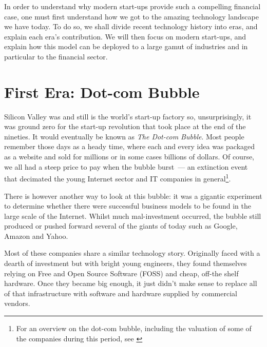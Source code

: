 \documentclass{book}
\begin{document}
In order to understand why modern start-ups provide such a compelling
financial case, one must first understand how we got to the amazing
technology landscape we have today. To do so, we shall divide recent
technology history into eras, and explain each era's contribution. We
will then focus on modern start-ups, and explain how this model can be
deployed to a large gamut of industries and in particular to the
financial sector.

\section{First Era: Dot-com Bubble}

Silicon Valley was and still is the world's start-up factory so,
unsurprisingly, it was ground zero for the start-up revolution that
took place at the end of the nineties. It would eventually be known as
\emph{The Dot-com Bubble}. Most people remember those days as a heady
time, where each and every idea was packaged as a website and sold for
millions or in some cases billions of dollars. Of course, we all had a
steep price to pay when the bubble burst~--- an extinction event that
decimated the young Internet sector and IT companies in
general\footnote{For an overview on the dot-com bubble, including the
  valuation of some of the companies during this period, see
  \cite{Wikipedia01}}.

There is however another way to look at this bubble: it was a gigantic
experiment to determine whether there were successful business models
to be found in the large scale of the Internet. Whilst much
mal-investment occurred, the bubble still produced or pushed forward
several of the giants of today such as Google, Amazon and Yahoo.

Most of these companies share a similar technology story. Originally
faced with a dearth of investment but with bright young engineers,
they found themselves relying on Free and Open Source Software (FOSS)
and cheap, off-the shelf hardware. Once they became big enough, it
just didn't make sense to replace all of that infrastructure with
software and hardware supplied by commercial vendors.
\end{document}
